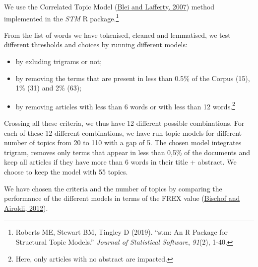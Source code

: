 \documentclass[]{elsarticle} %
\providecommand{\tightlist}{%
  \setlength{\itemsep}{0pt}\setlength{\parskip}{0pt}}
\begin{document}
We use the Correlated Topic Model (\protect\hyperlink{ref-blei2007}{Blei
and Lafferty, 2007}) method implemented in the \emph{STM} R
package.\footnote{Roberts ME, Stewart BM, Tingley D (2019). ``stm: An R
  Package for Structural Topic Models.'' \emph{Journal of Statistical
  Software}, \emph{91}(2), 1-40.}

From the list of words we have tokenised, cleaned and lemmatised, we
test different thresholds and choices by running different models:

\begin{itemize}
\tightlist
\item
  by exluding trigrams or not;
\item
  by removing the terms that are present in less than 0.5\% of the
  Corpus (15), 1\% (31) and 2\% (63);
\item
  by removing articles with less than 6 words or with less than 12
  words.\footnote{Here, only articles with no abstract are impacted.}
\end{itemize}

Crossing all these criteria, we thus have 12 different possible
combinations. For each of these 12 different combinations, we have run
topic models for different number of topics from 20 to 110 with a gap of
5. The chosen model integrates trigram, removes only terms that appear
in less than 0,5\% of the documents and keep all articles if they have
more than 6 words in their title + abstract. We choose to keep the model
with 55 topics.

We have chosen the criteria and the number of topics by comparing the
performance of the different models in terms of the FREX value
(\protect\hyperlink{ref-bischof2012}{Bischof and Airoldi, 2012}).
\end{document}
